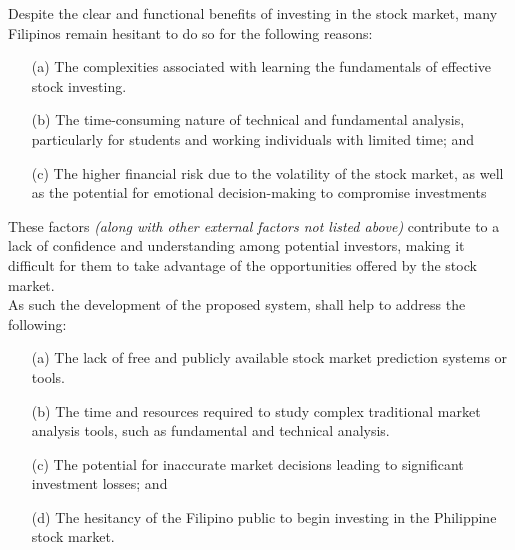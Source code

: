 Despite the clear and functional benefits of investing in the stock market, 
many Filipinos remain hesitant to do so for the following reasons:
\begin{itemize}
  \item[(a)] The complexities associated with learning the fundamentals 
  of effective stock investing.
  \item[(b)] The time-consuming nature of technical and fundamental 
  analysis, particularly for students and working individuals with limited time; and
  \item[(c)] The higher financial risk due to the volatility of the stock market, 
  as well as the potential for emotional decision-making to compromise investments
\end{itemize}

These factors \textit{(along with other external factors not listed above)} contribute 
to a lack of confidence and understanding among potential investors, 
making it difficult for them to take advantage of the opportunities offered by the stock market.
\hfill \\

As such the development of the proposed system, shall help to address the following:
\begin{itemize}
  \item[(a)] The lack of free and publicly available 
  stock market prediction systems or tools.
  \item[(b)] The time and resources required to study complex traditional 
  market analysis tools, such as fundamental and technical analysis.
  \item[(c)] The potential for inaccurate market decisions
  leading to significant investment losses; and
  \item[(d)] The hesitancy of the Filipino public to begin 
  investing in the Philippine stock market.
\end{itemize}